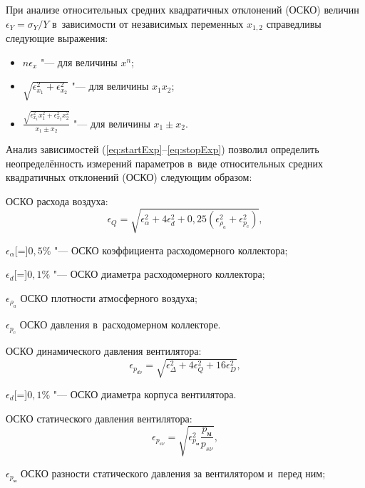При анализе относительных средних квадратичных отклонений (ОСКО) величин \(\epsilon_Y = \sigma_Y/Y\) в~зависимости от независимых переменных \(x_{1,2}\) справедливы следующие выражения:
\begin{itemize}
\item \(n\epsilon_x\) "--- для величины \(x^n\);
\item \(\sqrt{\epsilon_{x_1}^2+\epsilon_{x_2}^2}\) "--- для величины \(x_1 x_2\);
\item \(\frac{\sqrt{\epsilon_{x_1}^2 x_1^2 + \epsilon_{x_2}^2 x_2^2}}{x_1 \pm x_2}\) "--- для величины \(x_1 \pm x_2\).
\end{itemize}
Анализ зависимостей (\ref{eq:startExp}--\ref{eq:stopExp}) \autocite{Kersten1993} позволил определить неопределённость измерений параметров в~виде относительных средних квадратичных отклонений (ОСКО) следующим образом:

ОСКО расхода воздуха:
\begin{equation}
	\epsilon_Q = \sqrt{\epsilon_\alpha^2 + 4\epsilon_d^2 + 0,25(\epsilon_{\rho_a}^2 + \epsilon_{p_\text{c}}^2)},
\end{equation}
\begin{eqexpl}
	\item{\(\epsilon_\alpha\)}[=]\(0,5\%\) "--- ОСКО коэффициента расходомерного коллектора;
	\item{\(\epsilon_d\)}[=]\(0,1\%\) "--- ОСКО диаметра расходомерного коллектора;
	\item{\(\epsilon_{\rho_a}\)} ОСКО плотности атмосферного воздуха;
	\item{\(\epsilon_{p_\text{c}}\)} ОСКО давления в~расходомерном коллекторе.
\end{eqexpl}

ОСКО динамического давления вентилятора:
\begin{equation}
	\epsilon_{p_{d\nu}} = \sqrt{\epsilon_\Delta^2 + 4\epsilon_Q^2 + 16\epsilon_D^2},
\end{equation}
\begin{eqexpl}
	\item{\(\epsilon_d\)}[=]\(0,1\%\) "--- ОСКО диаметра корпуса вентилятора.
\end{eqexpl}

ОСКО статического давления вентилятора:
\begin{equation}
	\epsilon_{p_{s\nu}} = \sqrt{\epsilon_{p_\text{м}}^2 \frac{p_\text{м}}{p_{s\nu}}},
\end{equation}
\begin{eqexpl}
	\item{\(\epsilon_{p_\text{м}}\)} ОСКО разности статического давления за вентилятором и~перед ним;
\end{eqexpl}

